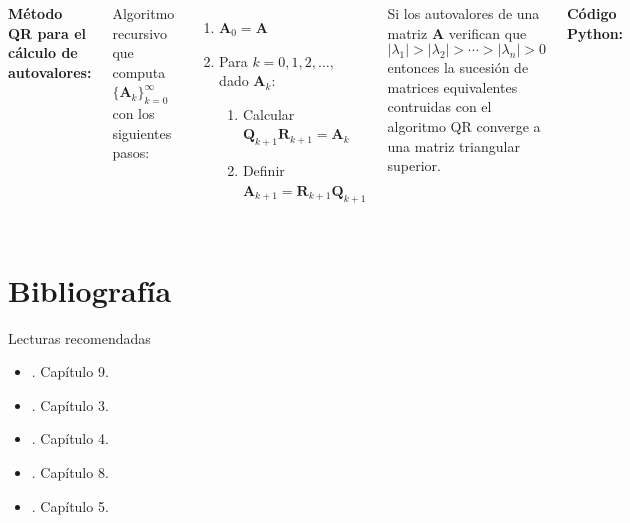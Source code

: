 \documentclass[9pt, aspectratio=169]{beamer}
\begin{document}
\begin{frame}
\begin{columns}[t]
\textbf{Método QR para el cálculo de autovalores:} %

Algoritmo recursivo que computa $\{ \bm{A}_k \}_{k = 0}^{\infty}$ con los siguientes pasos:
\begin{enumerate}
    \item $\bm{A}_0 = \bm{A}$
    \item Para $k = 0, 1, 2, \ldots,$ dado $\bm{A}_k$:
        \begin{enumerate}
        \item Calcular $\bm{Q}_{k+1} \bm{R}_{k+1} = \bm{A}_k $
        \item Definir $\bm{A}_{k+1} = \bm{R}_{k+1} \bm{Q}_{k+1}$
        \end{enumerate}
\end{enumerate} \pause

\begin{theorem}[Convergencia]
    Si los autovalores de una matriz $\bm{A}$ verifican que
    \[ |\lambda_1| > |\lambda_2| > \cdots > |\lambda_n| > 0 \]
    entonces la sucesión de matrices equivalentes contruidas con el algoritmo QR converge a una matriz triangular superior.
\end{theorem}

\textbf{Código Python:}

\end{columns}
\end{frame}



\section*{Bibliografía}
\begin{frame}{Lecturas recomendadas}
\begin{itemize}
    \item {}. Capítulo 9.
    \item {}. Capítulo 3.
    \item {}. Capítulo 4.
    \item {}. Capítulo 8.
    \item {}. Capítulo 5.
\end{itemize}
\end{frame}
\end{document}
